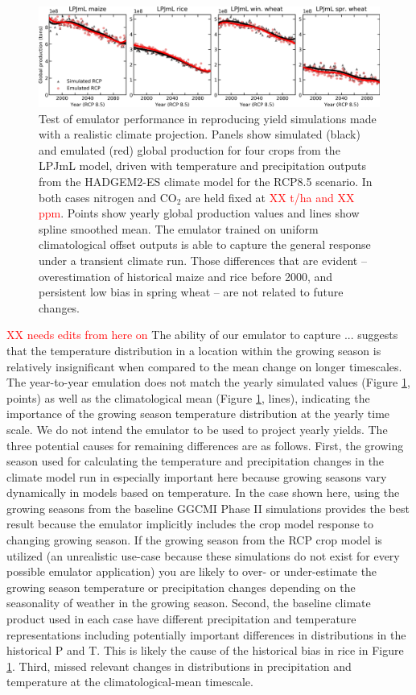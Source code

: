 \documentclass[gmd, manuscript]{copernicus} %
\begin{document}
\begin{figure}[ht]
  \centering
  \includegraphics[width = 16.3cm]{figures/LPJMLRCP85comp.png}
  \caption{
  Test of emulator performance in reproducing yield simulations made with a realistic climate projection. 
	Panels show simulated (black) and emulated (red) global production for four crops from the LPJmL model, driven with temperature and precipitation outputs from the HADGEM2-ES climate model for the RCP8.5 scenario. In both cases nitrogen and CO$_2$ are held fixed at \textcolor{red}{XX t/ha and XX ppm}.
  Points show yearly global production values and lines show spline smoothed mean.
    The emulator trained on uniform climatological offset outputs is able to capture the general response under a transient climate run. 
  Those differences that are evident -- overestimation of historical maize and rice before 2000, and persistent low bias in spring wheat -- are not related to future changes.
  }
  \label{fig:lpjmlrcp}
\end{figure}

\textcolor{red}{XX needs edits from here on} The ability of our emulator to capture ... suggests that the temperature distribution in a location within the growing season is relatively insignificant when compared to the mean change on longer timescales. 
The year-to-year emulation does not match the yearly simulated values (Figure \ref{fig:lpjmlrcp}, points) as well as the climatological mean (Figure \ref{fig:lpjmlrcp}, lines), indicating the importance of the growing season temperature distribution at the yearly time scale. 
We do not intend the emulator to be used to project yearly yields.
The three potential causes for remaining differences are as follows.
First, the growing season used for calculating the temperature and precipitation changes in the climate model run in especially important here because growing seasons vary dynamically in models based on temperature. 
In the case shown here, using the growing seasons from the baseline GGCMI Phase II simulations provides the best result because the emulator implicitly includes the crop model response to changing growing season. 
If the growing season from the RCP crop model is utilized (an unrealistic use-case because these simulations do not exist for every possible emulator application) you are likely to over- or under-estimate the growing season temperature or precipitation changes depending on the seasonality of weather in the growing season. 
Second, the baseline climate product used in each case have different precipitation and temperature representations including potentially important differences in distributions in the historical P and T. 
This is likely the cause of the historical bias in rice in Figure \ref{fig:lpjmlrcp}. 
Third, missed relevant changes in distributions in precipitation and temperature at the climatological-mean timescale.
\end{document}
